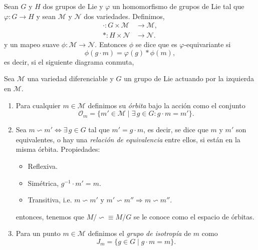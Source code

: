 \begin{mydef}  \cite{Kobayashi}
Sean $G$ y $H$ dos grupos de Lie y $\varphi$ un homomorfismo de grupos de Lie tal que $\varphi: G \rightarrow H$ y sean $\mathcal{M}$ y $\mathcal{N}$ dos variedades. Definimos,
%
\begin{align*}
\cdot : G \times \mathcal{M} & \longrightarrow \mathcal{M}, \\
* : H \times \mathcal{N} & \longrightarrow \mathcal{N}.
\end{align*}
%
y un mapeo suave $\phi: \mathcal{M} \rightarrow \mathcal{N}$.
Entonces $\phi$ se dice que es $\varphi$-equivariante si $$\phi(g \cdot m) = \varphi (g) * \phi(m),$$ es decir, si el siguiente diagrama conmuta,
%
\begin{center}
\end{center}
%
\end{mydef}

\begin{mydef} \cite{Dieck}
Sea $\mathcal{M}$ una variedad diferenciable y $G$ un grupo de Lie actuando por la izquierda en $\mathcal{M}$.
%
\begin{enumerate}
\item{Para cualquier $m \in \mathcal{M}$ definimos su \emph{\'{o}rbita} bajo la acci\'{o}n como el conjunto $$\mathcal{O}_{m} = \{m' \in \mathcal{M} \; \vert \; \exists \, g \in G : g \cdot m = m'\}.$$}
\item{Sea $m \backsim m' \Leftrightarrow \exists \, g \in G$ tal que $m' = g \cdot m$, es decir, se dice que $m$ y $m'$ son equivalentes, o hay una \emph{relaci\'{o}n de equivalencia} entre ellos, si est\'{a}n en la misma \'{o}rbita. Propiedades:
%
\begin{itemize}
\item{Reflexiva.}
\item{Sim\'{e}trica, $g^{-1} \cdot m' = m$.}
\item{Transitiva, i.e. $m \backsim m'$ y $m' \backsim m'' \Rightarrow m \backsim m''$.}
\end{itemize}
%
entonces, tenemos que $M/\backsim \equiv M/G$ se le conoce como el espacio de \'{o}rbitas.}
\item{Para un punto $m \in \mathcal{M}$ definimos el \emph{grupo de isotrop\'{i}a} de $m$ como $$J_{m} = \{g \in G \; \vert \; g \cdot m = m\}.$$}
\end{enumerate}
%
\end{mydef}

